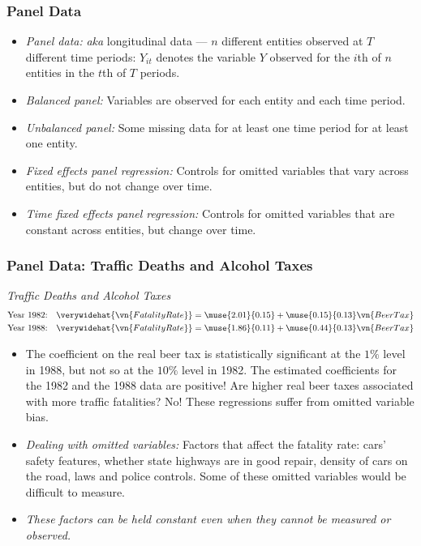 

\begin{frame}
\frametitle{Panel Data}
\begin{itemize}
\item \emph{Panel data:} 
\newlinequad
\textit{aka} longitudinal data --- $n$ different entities observed at $T$ different time periods: $Y_{it}$ denotes the variable $Y$ observed for the $i$th of $n$ entities in the $t$th of $T$ periods.
\item \emph{Balanced panel:} 
\newlinequad
Variables are observed for each entity and each time period. 
\item \emph{Unbalanced panel:} 
\newlinequad
Some missing data for at least one time period for at least one entity. 
\item \emph{Fixed effects panel regression:} 
\newlinequad
Controls for omitted variables that vary across entities, but do not change over time. 
\item \emph{Time fixed effects panel regression:} 
\newlinequad
Controls for omitted variables that are constant across entities, but change over time.
\end{itemize}
\end{frame}


\begin{frame}
\frametitle{Panel Data: Traffic Deaths and Alcohol Taxes}
\emph{Traffic Deaths and Alcohol Taxes}
\begin{align*}
\text{Year 1982:}\quad & \verywidehat{\vn{FatalityRate}}
  = \muse{2.01}{0.15} + \muse{0.15}{0.13} \vn{BeerTax}\\
\text{Year 1988:}\quad & \verywidehat{\vn{FatalityRate}}
  = \muse{1.86}{0.11} + \muse{0.44}{0.13} \vn{BeerTax}
\end{align*}
\begin{itemize}
\item The coefficient on the real beer tax is statistically significant at the $1\%$ level in 1988, but not so at the $10\%$ level in 1982. The estimated coefficients for the 1982 and the 1988 data are positive! Are higher real beer taxes associated with more traffic fatalities? No! These regressions suffer from omitted variable bias. 
\item \emph{Dealing with omitted variables:} Factors that affect the fatality rate: cars' safety features, whether state highways are in good repair, density of cars on the road, laws and police controls. Some of these omitted variables would be difficult to measure.
\item \emph{These factors can be held constant even when they cannot be measured or observed.}
\end{itemize}
\end{frame}


